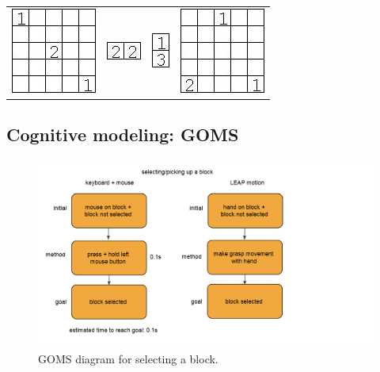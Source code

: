 \begin{appendix}
{\begin{tabular}{m{4cm}m{4cm}m{4cm}m{4cm}}
\centerline{\includegraphics{imgs/models/model17}}&\centerline{\includegraphics{imgs/models/model18}}&\centerline{\includegraphics{imgs/models/model19}}&\centerline{\includegraphics{imgs/models/model20}}
\end{tabular}}

\newpage
\subsection{Cognitive modeling: GOMS}
\begin{figure}[!htbp]
\includegraphics[width=\textwidth]{imgs/selectingblocks.png}
\caption{GOMS diagram for selecting a block.}
\label{fig:selectingblocks}
\end{figure}


\end{appendix}
